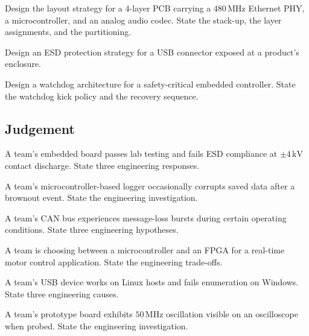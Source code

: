 \begin{exercise}
Design the layout strategy for a $4$-layer PCB carrying a $480\,\text{MHz}$ Ethernet PHY, a microcontroller, and an analog audio codec. State the stack-up, the layer assignments, and the partitioning.
\end{exercise}

\begin{exercise}
Design an ESD protection strategy for a USB connector exposed at a product's enclosure.
\end{exercise}

\begin{exercise}
Design a watchdog architecture for a safety-critical embedded controller. State the watchdog kick policy and the recovery sequence.
\end{exercise}

\subsection*{Judgement}

\begin{exercise}
A team's embedded board passes lab testing and fails ESD compliance at $\pm 4\,\text{kV}$ contact discharge. State three engineering responses.
\end{exercise}

\begin{exercise}
A team's microcontroller-based logger occasionally corrupts saved data after a brownout event. State the engineering investigation.
\end{exercise}

\begin{exercise}
A team's CAN bus experiences message-loss bursts during certain operating conditions. State three engineering hypotheses.
\end{exercise}

\begin{exercise}
A team is choosing between a microcontroller and an FPGA for a real-time motor control application. State the engineering trade-offs.
\end{exercise}

\begin{exercise}
A team's USB device works on Linux hosts and fails enumeration on Windows. State three engineering causes.
\end{exercise}

\begin{exercise}
A team's prototype board exhibits $50\,\text{MHz}$ oscillation visible on an oscilloscope when probed. State the engineering investigation.
\end{exercise}

